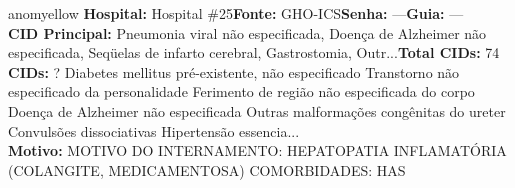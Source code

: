 \documentclass[a4paper,10pt]{article}
\begin{document}
\begin{anomalycard}[Interna\c{c}\~{a}o \#451 | Pac. \#525 | MODERADO (z=2.64) | LOS: 4d | 08/03/2026\,$\to$\,12/03/2026]{anomyellow}
\textbf{Hospital:} Hospital \#25\quad \textbf{Fonte:} GHO-ICS\quad \textbf{Senha:} ---\quad \textbf{Guia:} ---\\

\textbf{CID Principal:} {\small Pneumonia viral não especificada, Doença de Alzheimer não especificada, Seqüelas de infarto cerebral, Gastrostomia, Outr...}\quad\textbf{Total CIDs:} 74\\

\textbf{CIDs:} {\scriptsize ? \textbar{} Diabetes mellitus pré-existente, não especificado \textbar{} Transtorno não especificado da personalidade \textbar{} Ferimento de região não especificada do corpo \textbar{} Doença de Alzheimer não especificada \textbar{} Outras malformações congênitas do ureter \textbar{} Convulsões dissociativas \textbar{} Hipertensão essencia...}\\

\textbf{Motivo:} {\scriptsize MOTIVO DO INTERNAMENTO: HEPATOPATIA INFLAMATÓRIA (COLANGITE, MEDICAMENTOSA)  COMORBIDADES: HAS}\\

\end{anomalycard}
\end{document}
